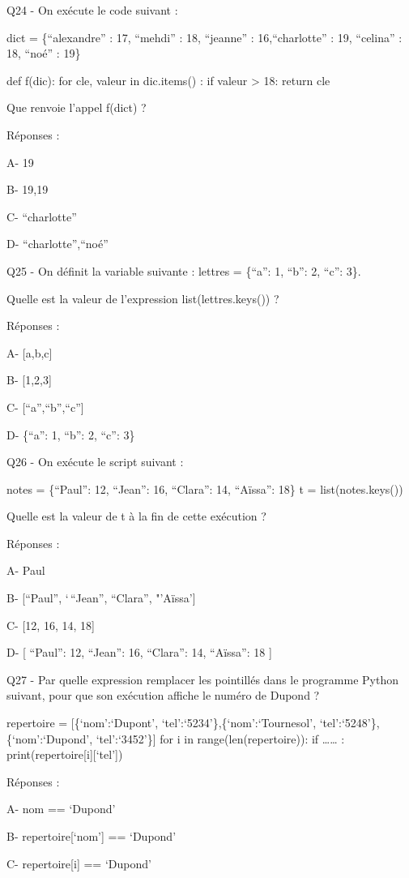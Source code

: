 \documentclass[
]{book}
\begin{document}
Q24 - On exécute le code suivant :

dict = \{``alexandre'' : 17, ``mehdi'' : 18, ``jeanne'' : 16,``charlotte'' : 19, ``celina'' : 18, ``noé'' : 19\}

def f(dic):
for cle, valeur in dic.items() :
if valeur \textgreater{} 18:
return cle

Que renvoie l'appel f(dict) ?

Réponses :

A- 19

B- 19,19

C- ``charlotte''

D- ``charlotte'',``noé''

Q25 - On définit la variable suivante : lettres = \{``a'': 1, ``b'': 2, ``c'': 3\}.

Quelle est la valeur de l'expression list(lettres.keys()) ?

Réponses :

A- {[}a,b,c{]}

B- {[}1,2,3{]}

C- {[}``a'',``b'',``c''{]}

D- \{``a'': 1, ``b'': 2, ``c'': 3\}

Q26 - On exécute le script suivant :

notes = \{``Paul'': 12, ``Jean'': 16, ``Clara'': 14, ``Aïssa'': 18\}
t = list(notes.keys())

Quelle est la valeur de t à la fin de cette exécution ?

Réponses :

A- Paul

B- {[}``Paul'', `\,``Jean'', ``Clara'', "'Aïssa'{]}

C- {[}12, 16, 14, 18{]}

D- {[} ``Paul'': 12, ``Jean'': 16, ``Clara'': 14, ``Aïssa'': 18 {]}

Q27 - Par quelle expression remplacer les pointillés dans le programme Python suivant, pour que son exécution affiche le numéro de Dupond ?

repertoire = {[}\{`nom':`Dupont', `tel':`5234'\},\{`nom':`Tournesol', `tel':`5248'\}, \{`nom':`Dupond', `tel':`3452'\}{]}
for i in range(len(repertoire)):
if \ldots\ldots{} :
print(repertoire{[}i{]}{[}`tel'{]})

Réponses :

A- nom == `Dupond'

B- repertoire{[}`nom'{]} == `Dupond'

C- repertoire{[}i{]} == `Dupond'
\end{document}
